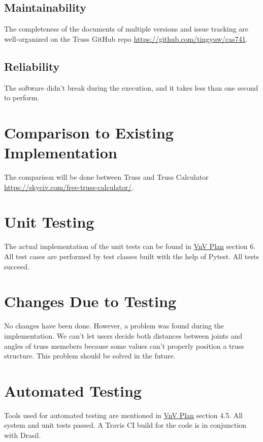 \documentclass[12pt, titlepage]{article}
\begin{document}
\subsection{Maintainability} \label{main}
The completeness of the documents of multiple versions and issue tracking are 
well-organized on the Truss GitHub repo  
\url{https://github.com/tingyuw/cas741}.

\subsection{Reliability} \label{relia}
The software didn't break during the execution, and it takes less than one 
second to perform.

\section{Comparison to Existing Implementation}	
The comparison will be done between Truss and Truss Calculator
\url{https://skyciv.com/free-truss-calculator/}.

\section{Unit Testing}
The actual implementation of the unit tests can be found in
\href{https://github.com/tingyuw/cas741/blob/master/docs/VnVPlan/VnVPlan.pdf}{VnV
 Plan} section 6. All test cases are performed by test classes built with the 
 help of Pytest. All tests succeed.

\section{Changes Due to Testing}
No changes have been done. However, a problem was found during the 
implementation. We can't let users decide both distances between joints and 
angles of truss memebers because some values can't properly position a truss 
structure. This problem should be solved in the future.

\section{Automated Testing}
Tools used for automated testing are mentioned in 
\href{https://github.com/tingyuw/cas741/blob/master/docs/VnVPlan/VnVPlan.pdf}{VnV
 Plan} section 4.5. All system and unit tests passed. A Travis CI build for the 
code is in conjunction with Drasil.
\end{document}
